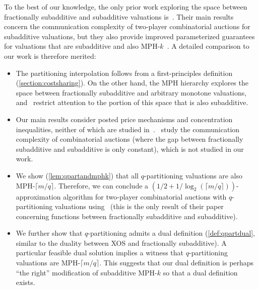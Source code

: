 \documentclass[11pt]{article}%
\numberwithin{theorem}{subsection}
\begin{document}
To the best of our knowledge, the only prior work exploring the space between fractionally subadditive and subadditive valuations is~\cite{EzraFNTW19}. Their main results concern the communication complexity of two-player combinatorial auctions for subadditive valuations, but they also provide improved parameterized guarantees for valuations that are subadditive and also MPH-$k$~\cite{FeigeFIILS15}. A detailed comparison to our work is therefore merited:
\begin{itemize}
\item The partitioning interpolation follows from a first-principles definition (\cref{section:costsharing}). On the other hand, the MPH hierarchy explores the space between fractionally subadditive and arbitrary monotone valuations, and~\cite{EzraFNTW19} restrict attention to the portion of this space that is also subadditive.
\item Our main results consider posted price mechanisms and concentration inequalities, neither of which are studied in~\cite{EzraFNTW19}.~\cite{EzraFNTW19} study the communication complexity of combinatorial auctions (where the gap between fractionally subadditive and subadditive is only constant), which is not studied in our work.
\item We show (\cref{lem:qpartandmphk}) that all $q$-partitioning valuations are also MPH-$\lceil m/q\rceil$. Therefore, we can conclude a $(1/2 + 1/\log_2 (\lceil m/q \rceil))$-approximation algorithm for two-player combinatorial auctions with $q$-partitioning valuations using~\cite{EzraFNTW19} (this is the only result of their paper concerning functions between fractionally subadditive and subadditive).
\item We further show that $q$-partitioning admits a dual definition (\cref{def:qpartdual}, similar to the duality between XOS and fractionally subadditive). A particular feasible dual solution implies a witness that $q$-partitioning valuations are MPH-$\lceil m/q\rceil$. This suggests that our dual definition is perhaps ``the right'' modification of subadditive MPH-$k$ so that a dual definition exists.
\end{itemize}
\vspace{2mm}
\end{document}
